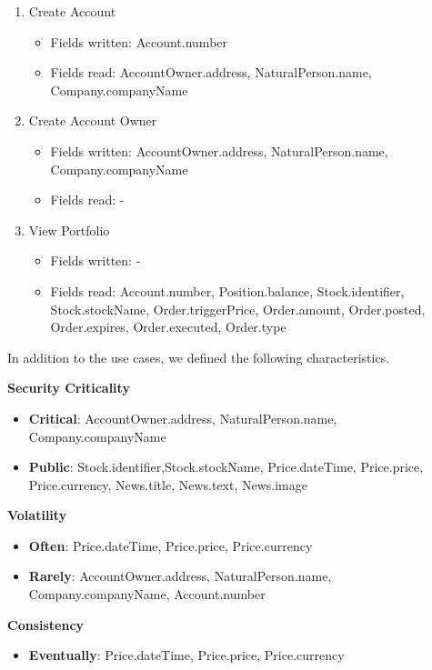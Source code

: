 \begin{enumerate}
\begin{itemize}
	\end{itemize}
\item Create Account
	\begin{itemize}
	\item Fields written: Account.number
	\item Fields read: AccountOwner.address, NaturalPerson.name, Company.companyName
	\end{itemize}
\item Create Account Owner
	\begin{itemize}
	\item Fields written: AccountOwner.address, NaturalPerson.name, Company.companyName
	\item Fields read: -
	\end{itemize}
\item View Portfolio
	\begin{itemize}
	\item Fields written: -
	\item Fields read: Account.number, Position.balance, Stock.identifier, Stock.stockName, Order.triggerPrice, Order.amount, Order.posted, Order.expires, Order.executed, Order.type
	\end{itemize}
\end{enumerate}

In addition to the use cases, we defined the following characteristics.

\textbf{Security Criticality}

\begin{itemize}
\item \textbf{Critical}: AccountOwner.address, NaturalPerson.name, Company.companyName
\item \textbf{Public}: Stock.identifier,Stock.stockName, Price.dateTime, Price.price, Price.currency, News.title, News.text, News.image
\end{itemize} 

\textbf{Volatility}

\begin{itemize}
\item \textbf{Often}: Price.dateTime, Price.price, Price.currency
\item \textbf{Rarely}: AccountOwner.address, NaturalPerson.name, Company.companyName, Account.number
\end{itemize}

\textbf{Consistency}

\begin{itemize}
\item \textbf{Eventually}: Price.dateTime, Price.price, Price.currency
\end{itemize}

